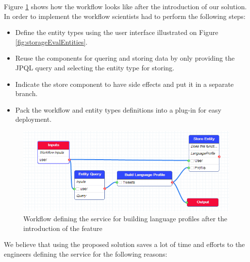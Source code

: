 Figure \ref{fig:storageEvalAfter} shows how the workflow looks like after the introduction of our solution. In order to implement the workflow scientists had to perform the following steps:
\begin{itemize}
	\item Define the entity types using the user interface illustrated on Figure \ref{fig:storageEvalEntities}.
	\item Reuse the components for quering and storing data by only providing the JPQL query and selecting the entity type for storing.
	\item Indicate the store component to have side effects and put it in a separate branch.
	\item Pack the workflow and entity types definitions into a plug-in for easy deployment.
\end{itemize}

\begin{figure}[h!]
  \centering
  	\includegraphics[scale=0.5]{storage/eval/after.png}
  \caption{Workflow defining the service for building language profiles after the introduction of the feature}
  \label{fig:storageEvalAfter}
\end{figure}

We believe that using the proposed solution saves a lot of time and efforts to the engineers defining the service for the following reasons:

